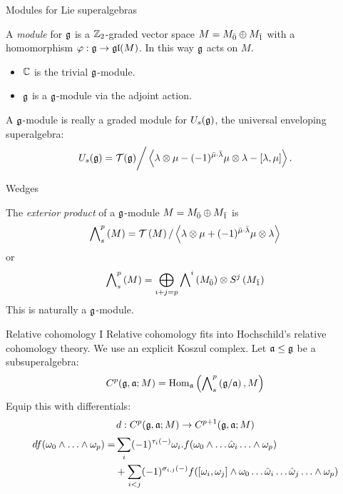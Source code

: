 \documentclass[handout]{beamer}
\begin{document}
\begin{frame}{Modules for Lie superalgebras}\pause
  \begin{definition}
    A \emph{module} for $\mathfrak{g}$ is a $\mathbb{Z}_2$-graded vector space $M = {M}_{\bar{0}} \oplus {M}_{\bar{1}}$ with a homomorphism $\varphi: \mathfrak{g} \to \mathfrak{gl}(M)$. In this way $\mathfrak{g}$ acts on $M$.
  \end{definition}\pause
  \begin{example}
    \begin{itemize}
    \item $\mathbb{C}$ is the trivial $\mathfrak{g}$-module.\pause
    \item $\mathfrak{g}$ is a $\mathfrak{g}$-module via the adjoint action.
    \end{itemize}
    
  \end{example}\pause
  A $\mathfrak{g}$-module is really a graded module for $U_s(\mathfrak{g})$, the universal enveloping superalgebra:
  \[
    U_s(\mathfrak{g}) = \mathcal{T}(\mathfrak{g}) \bigg/ \left< \lambda \otimes \mu - (-1)^{\bar \mu \cdot \bar \lambda} \mu \otimes \lambda  - [\lambda, \mu]\right>.
  \]
\end{frame}

\begin{frame}{Wedges}\pause
  \begin{definition}
    The \emph{exterior product} of a $\mathfrak{g}$-module $M = {M}_{\bar{0}} \oplus {M}_{\bar{1}}$ is
    \[
      \bigwedge\nolimits^{p}_s\left(M\right) = \mathcal{T}\left(M\right)/\left< \lambda \otimes \mu + (-1)^{\bar \mu \cdot \bar \lambda} \mu \otimes \lambda \right>
    \]\pause
    or
    \[
      \bigwedge\nolimits^{p}_s\left(M\right) = \bigoplus_{i+j=p} \bigwedge\nolimits^{i}\left({M}_{\bar{0}}\right) \otimes {S}^j\left({M}_{\bar{1}}\right)
    \]\pause
 This is naturally a $\mathfrak{g}$-module.   
  \end{definition}
\end{frame}

\begin{frame}{Relative cohomology I}\pause
  Relative cohomology fits into Hochschild's relative cohomology theory. \pause We use an explicit Koszul complex. \pause Let $\mathfrak{a} \leq \mathfrak{g}$ be a subsuperalgebra:
  \[
    C^p(\mathfrak{g},\mathfrak{a};M) = \operatorname{Hom}_{\mathfrak{a}}\left(\bigwedge\nolimits^{p}_s\left( \mathfrak{g}/\mathfrak{a} \right), M \right)
  \]\pause
  Equip this with differentials:
  \[
    d: C^{p}(\mathfrak{g},\mathfrak{a};M) \to C^{p+1}(\mathfrak{g},\mathfrak{a};M)
  \]\pause
  \begin{align*}
    df(\omega_0\wedge\ldots\wedge\omega_p) = &\sum_i (-1)^{\tau_i(-)} \omega_i . f(\omega_0 \wedge \ldots \hat {\omega}_i \ldots \wedge \omega_p) \\
    &+ \sum_{i < j} (-1)^{\sigma_{i,j}(-)} f([\omega_i,\omega_j]\wedge \omega_0 \ldots \hat {\omega}_i \ldots \hat {\omega}_j \ldots \wedge \omega_p)
  \end{align*}
\end{frame}
\end{document}
